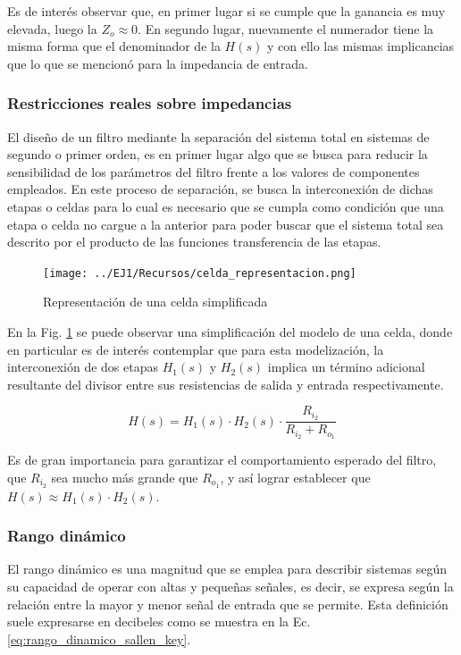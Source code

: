 Es de inter\'es observar que, en primer lugar si se cumple que la ganancia es muy elevada, luego la $Z_o \approx 0$. En segundo lugar,
nuevamente el numerador tiene la misma forma que el denominador de la $H(s)$ y con ello las mismas implicancias que lo que se mencion\'o para la impedancia de entrada.

\subsubsection{Restricciones reales sobre impedancias}
El dise\~no de un filtro mediante la separaci\'on del sistema total en sistemas de segundo o primer orden, es en primer lugar algo que se busca para reducir la sensibilidad
de los par\'ametros del filtro frente a los valores de componentes empleados. En este proceso de separaci\'on, se busca la interconexi\'on de dichas etapas o celdas para lo cual
es necesario que se cumpla como condici\'on que una etapa o celda no cargue a la anterior para poder buscar que el sistema total sea descrito por el producto de las funciones transferencia
de las etapas.

\begin{figure}[H]
	\centering
	\texttt{[image: ../EJ1/Recursos/celda\_representacion.png]}
	\caption{Representaci\'on de una celda simplificada}
	\label{fig:celda_representacion}
\end{figure}

En la Fig. \ref{fig:celda_representacion} se puede observar una simplificaci\'on del modelo de una celda,
donde en particular es de inter\'es contemplar que para esta modelizaci\'on, la interconexi\'on de dos etapas $H_1(s)$ y $H_2(s)$
implica un t\'ermino adicional resultante del divisor entre sus resistencias de salida y entrada respectivamente.

\begin{equation}
H(s) = H_1(s) \cdot H_2(s) \cdot \frac{R_{i_2}}{R_{i_2} + R_{o_1}}
\end{equation}

Es de gran importancia para garantizar el comportamiento esperado del filtro, que $R_{i_2}$ sea mucho m\'as grande que $R_{o_1}$, y as\'i
lograr establecer que $H(s) \approx H_1(s) \cdot H_2(s)$.

\subsubsection{Rango din\'amico}
El rango din\'amico es una magnitud que se emplea para describir sistemas seg\'un su capacidad de operar con altas y peque\~nas se\~nales, es decir,
se expresa seg\'un la relaci\'on entre la mayor y menor se\~nal de entrada que se permite. Esta definici\'on suele expresarse en decibeles como se muestra en la
Ec. \ref{eq:rango_dinamico_sallen_key}.


